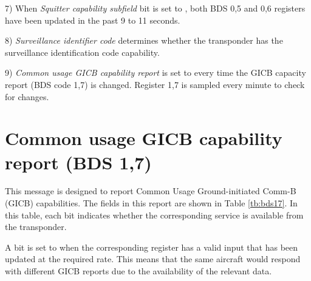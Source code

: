 7) When \emph{Squitter capability subfield} bit is set to \1, both BDS 0,5 and 0,6 registers have been updated in the past 9 to 11 seconds.

8) \emph{Surveillance identifier code} determines whether the transponder has the surveillance identification code capability.

9) \emph{Common usage GICB capability report} is set to \1 every time the GICB capacity report (BDS code 1,7) is changed. Register 1,7 is sampled every minute to check for changes.

\section{Common usage GICB capability report (BDS 1,7)}

This message is designed to report Common Usage Ground-initiated Comm-B (GICB) capabilities. The fields in this report are shown in Table \ref{tb:bds17}. In this table, each bit indicates whether the corresponding service is available from the transponder. 

A bit is set to \1 when the corresponding register has a valid input that has been updated at the required rate. This means that the same aircraft would respond with different GICB reports due to the availability of the relevant data.

